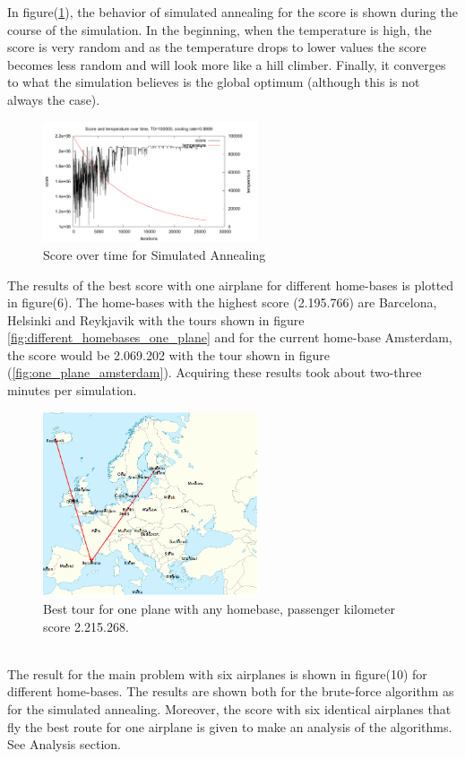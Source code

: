 \documentclass[journal]{IEEEtran}
\begin{document}
In figure(\ref{fig:simulated_annealing_score}), the behavior of simulated annealing for the score is shown during the course of the simulation. In the beginning, when the temperature is high, the score is very random and as the temperature drops to lower values the score becomes less random and will look more like a hill climber. Finally, it converges to what the simulation believes is the global optimum (although this is not always the case).\\
\begin{figure}[H]
\centering
\includegraphics[width=2.5in]{score_over_time}
\caption{Score over time for Simulated Annealing}
\label{fig:simulated_annealing_score}
\end{figure}
The results of the best score with one airplane for different home-bases is plotted in figure(6). The home-bases with the highest score (2.195.766) are Barcelona, Helsinki and Reykjavik with the tours shown in figure \ref{fig:different_homebases_one_plane} and for the current home-base Amsterdam, the score would be 2.069.202 with the tour shown in figure (\ref{fig:one_plane_amsterdam}). Acquiring these results took about two-three minutes per simulation.
\\
\begin{figure}[!h]
\centering
\includegraphics[width=2.5in]{best_tour_one_plane}
\caption{Best tour for one plane with any homebase, passenger kilometer score 2.215.268.}
\label{fig:one_plane}
\end{figure}
\\
The result for the main problem with six airplanes is shown in figure(10) for different home-bases. The results are shown both for the brute-force algorithm as for the simulated annealing. Moreover, the score with six identical airplanes that fly the best route for one airplane is given to make an analysis of the algorithms. See Analysis section. 
\end{document}
